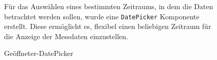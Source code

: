 \begin{inhalt}
\begin{enumerate}[label=\textbf{\arabic*.}]
\begin{figure}[!htb]
\centering
\begin{minipage}[c]{0.4\textwidth}
    \centering
    \vspace*{\fill}
    Für das Auswählen eines bestimmten Zeitraums, in dem die Daten betrachtet werden sollen, wurde eine \texttt{DatePicker} Komponente erstellt.  
    Diese ermöglicht es, flexibel einen beliebigen Zeitraum für die Anzeige der Messdaten einzustellen.
    \vspace*{\fill}
\end{minipage}
\hfill
\begin{minipage}[c]{0.55\textwidth}
    \centering
    \caption[Geöffneter DatePicker]{Geöffneter-DatePicker}
    \label{fig:datepicker_geoeffnet}
\end{minipage}
\end{figure}






\end{enumerate}
\end{inhalt}
